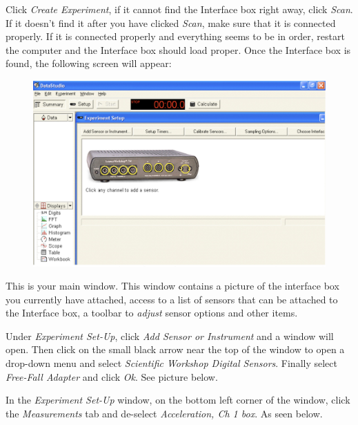 Click \emph{Create Experiment}, if it cannot find the Interface box right away, click \emph{Scan}.
If it doesn’t find it after you have clicked \emph{Scan}, make sure that it is connected properly.
If it is connected properly and everything seems 
to be in order, restart the computer and the Interface box should load proper.
Once the Interface box is found, the following screen will appear:

\begin{figure}[ht]
  \centerline{\includegraphics[scale=0.4]{resources/photo3.jpg}}
\end{figure}

This is your main window. This window contains a picture of the interface box you currently have attached, 
access to a list of sensors that can be attached to the Interface box, a toolbar to \emph{adjust} sensor options and other items.

Under \emph{Experiment Set-Up}, click \emph{Add Sensor or Instrument} and a window will open. 
Then click on the small black arrow near the top of the window to open a drop-down 
menu and select \emph{Scientific Workshop Digital Sensors}. Finally select \emph{Free-Fall Adapter} and click \emph{Ok}. See picture below.

In the \emph{Experiment Set-Up} window, on the bottom left corner of the window, 
click the \emph{Measurements} tab and de-select \emph{Acceleration, Ch 1 box}. As seen below.

